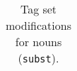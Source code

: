 \documentclass[a4paper,12pt,english]{book}
\begin{document}
\begin{appendices}
\begin{table}
\begin{tabular}{@{}ll@{}}
            \bottomrule
        \end{tabular}
        \caption{Tag set modifications for nouns (\texttt{subst}).}
        \label{substtagsets}
    \end{table}


\end{appendices}
\end{document}
